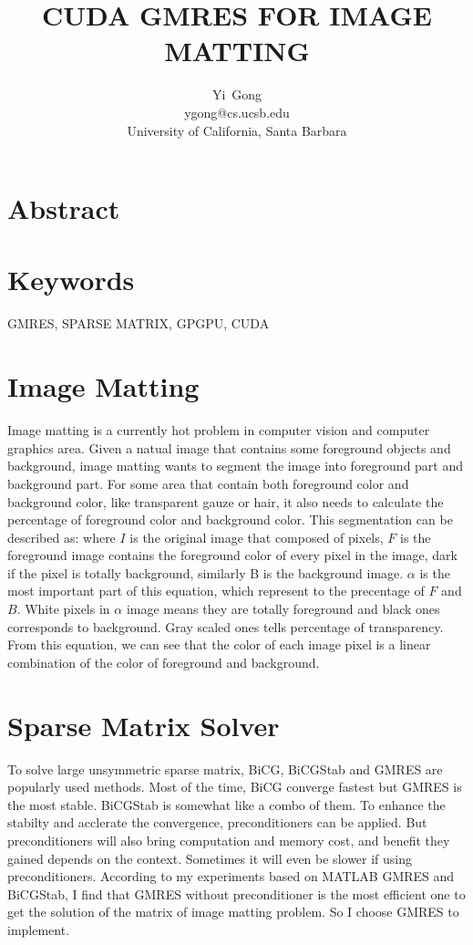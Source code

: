 \documentclass[12pt]{article}
\title{CUDA GMRES FOR IMAGE MATTING}
\author{Yi~Gong\\ygong@cs.ucsb.edu\\University of California, Santa Barbara}
\date{}
\begin{document}
\maketitle

\section*{Abstract}


\small
\section*{Keywords} GMRES, SPARSE MATRIX, GPGPU, CUDA
\section{Image Matting}
Image matting is a currently hot problem in computer vision and computer graphics area. Given a natual image that contains some foreground objects and background, image matting wants to segment the image into foreground part and background part. For some area that contain both foreground color and background color, like transparent gauze or hair, it also needs to calculate the percentage of foreground color and background color. This segmentation can be described as:
\endequation
where $I$ is the original image that composed of pixels, $F$ is the foreground image contains the foreground color of every pixel in the image, dark if the pixel is totally background, similarly B is the background image. $\alpha$ is the most important part of this equation, which represent to the precentage of $F$ and $B$. White pixels in $\alpha$ image means they are totally foreground and black ones corresponds to background. Gray scaled ones tells percentage of transparency. From this equation, we can see that the color of each image pixel is a linear combination of the color of foreground and background. 

\section{Sparse Matrix Solver}
To solve large unsymmetric sparse matrix, BiCG, BiCGStab and GMRES are popularly used methods. Most of the time, BiCG converge fastest but GMRES is the most stable. BiCGStab is somewhat like a combo of them. To enhance the stabilty and acclerate the convergence, preconditioners can be applied. But preconditioners will also bring computation and memory cost, and benefit they gained depends on the context. Sometimes it will even be slower if using preconditioners. According to my experiments based on MATLAB GMRES and BiCGStab, I find that GMRES without preconditioner is the most efficient one to get the solution of the matrix of image matting problem. So I choose GMRES to implement. 
\end{document}
